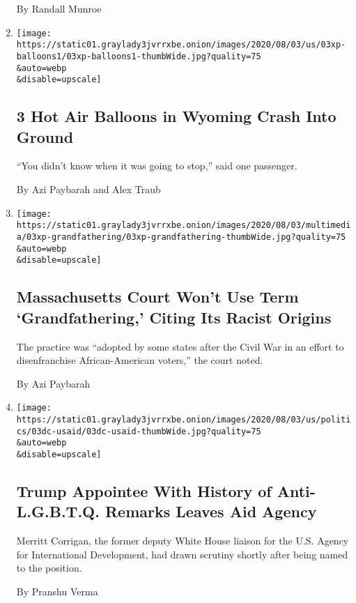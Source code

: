 \begin{enumerate}
  By Randall Munroe
\item
  \href{/2020/08/04/us/wyoming-hot-air-balloons-crash.html}{}

  \texttt{[image: https://static01.graylady3jvrrxbe.onion/images/2020/08/03/us/03xp-balloons1/03xp-balloons1-thumbWide.jpg?quality=75\\\&auto=webp\\\&disable=upscale]}

  \hypertarget{3-hot-air-balloons-in-wyoming-crash-into-ground}{%
  \subsection{3 Hot Air Balloons in Wyoming Crash Into
  Ground}\label{3-hot-air-balloons-in-wyoming-crash-into-ground}}

  ``You didn't know when it was going to stop,'' said one passenger.

  By Azi Paybarah and Alex Traub
\item
  \href{/2020/08/03/us/racism-massachusetts-grandfathering.html}{}

  \texttt{[image: https://static01.graylady3jvrrxbe.onion/images/2020/08/03/multimedia/03xp-grandfathering/03xp-grandfathering-thumbWide.jpg?quality=75\\\&auto=webp\\\&disable=upscale]}

  \hypertarget{massachusetts-court-wont-use-term-grandfathering-citing-its-racist-origins}{%
  \subsection{Massachusetts Court Won't Use Term `Grandfathering,'
  Citing Its Racist
  Origins}\label{massachusetts-court-wont-use-term-grandfathering-citing-its-racist-origins}}

  The practice was ``adopted by some states after the Civil War in an
  effort to disenfranchise African-American voters,'' the court noted.

  By Azi Paybarah
\item
  \href{/2020/08/03/us/politics/merritt-corrigan-usaid.html}{}

  \texttt{[image: https://static01.graylady3jvrrxbe.onion/images/2020/08/03/us/politics/03dc-usaid/03dc-usaid-thumbWide.jpg?quality=75\\\&auto=webp\\\&disable=upscale]}

  \hypertarget{trump-appointee-with-history-of-anti-lgbtq-remarks-leaves-aid-agency}{%
  \subsection{Trump Appointee With History of Anti-L.G.B.T.Q. Remarks
  Leaves Aid
  Agency}\label{trump-appointee-with-history-of-anti-lgbtq-remarks-leaves-aid-agency}}

  Merritt Corrigan, the former deputy White House liaison for the U.S.
  Agency for International Development, had drawn scrutiny shortly after
  being named to the position.

  By Pranshu Verma
\end{enumerate}

